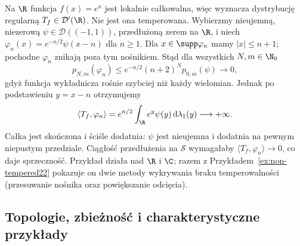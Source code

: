 \begin{przyklad}
\label{ex:non-tempered25}
Na $\R$ funkcja $f(x)=e^x$ jest lokalnie całkowalna,
więc wyznacza dystrybucję regularną $T_f\in\mathcal D'(\R)$.
Nie jest ona temperowana. Wybierzmy nieujemną, niezerową
$\psi\in\mathcal D((-1,1))$, przedłużoną zerem na $\R$,
i niech $\varphi_n(x)=e^{-n/2}\psi(x-n)$ dla $n\ge1$.
Dla $x\in\supp\varphi_n$ mamy $|x|\le n+1$; pochodne
$\varphi_n$ znikają poza tym nośnikiem. Stąd dla wszystkich
$N,m\in\N_0$
\[
 p_{N,m}(\varphi_n)\le e^{-n/2}(n+2)^N p_{0,m}(\psi)
 \longrightarrow0,
\]
gdyż funkcja wykładnicza rośnie szybciej niż każdy
wielomian. Jednak po podstawieniu $y=x-n$ otrzymujemy
\[
 \langle T_f,\varphi_n\rangle=
 e^{n/2}\int_\R e^y\psi(y)\,\mathrm d\lambda_1(y)
 \longrightarrow+\infty.
\]
Całka jest skończona i ściśle dodatnia: $\psi$ jest
nieujemna i dodatnia na pewnym niepustym przedziale.
Ciągłość przedłużenia na $\mathcal S$ wymagałaby
$\langle T_f,\varphi_n\rangle\to0$, co daje sprzeczność.
Przykład działa nad $\R$ i $\C$; razem z
Przykładem~\ref{ex:non-tempered22} pokazuje on dwie
metody wykrywania braku temperowalności (przesuwanie
nośnika oraz powiększanie odcięcia).
\end{przyklad}

\subsection{Topologie, zbieżność i charakterystyczne przykłady}


